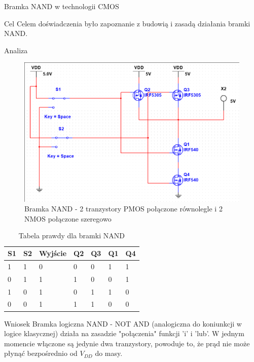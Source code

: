 \documentclass[a4paper]{scrartcl}
\begin{document}
	\begin{section}{Bramka NAND w technologii CMOS}
		\begin{subsection}{Cel}
			Celem doświadczenia było zapoznanie z budowią i zasadą działania bramki NAND.
		\end{subsection}
		\begin{subsection}{Analiza}
				\begin{figure}[ht]
				\begin{center}
					\includegraphics[width=0.7\linewidth]{exercise-8-nand-gate}
					\caption{Bramka NAND - 2 tranzystory PMOS połączone równolegle i 2 NMOS połączone szeregowo}
					\label{fig:circuit-7-cmos}
				\end{center}
				\end{figure}
				\begin{table}[!ht]
					\begin{center}
					\caption{Tabela prawdy dla bramki NAND}
					\begin{tabular}{| l | l | l | l | l | l | l |}
						\hline
						S1 & S2 & Wyjście & Q2 & Q3 & Q1 & Q4 \\\hline
						1 & 1 & 0 & 0 & 0 & 1 & 1 \\ \hline
						0 & 1 & 1 & 1 & 0 & 0 & 1 \\ \hline
						1 & 0 & 1 & 0 & 1 & 1 & 0 \\ \hline
						0 & 0 & 1 & 1 & 1 & 0 & 0 \\ \hline
					\end{tabular}
					\end{center}
				\end{table}
		\end{subsection}
		\begin{subsection}{Wniosek}
			Bramka logiczna NAND - NOT AND (analogiczna do koniunkcji w logice klasycznej) działa na zasadzie "połączenia" funkcji 'i' i 'lub'. W jednym momencie włączone są jedynie dwa tranzystory, powoduje to, że prąd nie może płynąć bezpośrednio od $ V_{DD} $ do masy.
		\end{subsection}
	\end{section}
\end{document}
